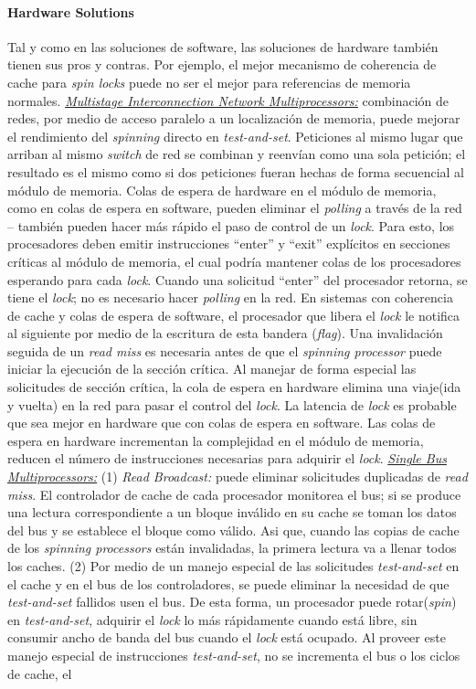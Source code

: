 \paragraph{\textnormal{\textbf{Hardware Solutions}}}
Tal y como en las soluciones de software, las soluciones de hardware también tienen sus pros y contras. Por ejemplo, el mejor mecanismo de coherencia de cache para \textit{spin locks} puede no ser el mejor para referencias de memoria normales. \underline{\textit{Multistage Interconnection Network Multiprocessors:}} combinación de redes, por medio de acceso paralelo a un localización de memoria, puede mejorar el rendimiento del \textit{spinning} directo en \textit{test-and-set}. Peticiones al mismo lugar que arriban al mismo \textit{switch} de red se combinan y reenvían como una sola petición; el resultado es el mismo como si dos peticiones fueran hechas de forma secuencial al módulo de memoria. Colas de espera de hardware en el módulo de memoria, como en colas de espera en software, pueden eliminar el \textit{polling} a través de la red -- también pueden hacer más rápido el paso de control de un \textit{lock}. Para esto, los procesadores deben emitir instrucciones ``enter'' y ``exit'' explícitos en secciones críticas al módulo de memoria, el cual podría mantener colas de los procesadores esperando para cada \textit{lock}. Cuando una solicitud ``enter'' del procesador retorna, se tiene el \textit{lock}; no es necesario hacer \textit{polling} en la red. En sistemas con coherencia de cache y colas de espera de software, el procesador que libera el \textit{lock} le notifica al siguiente por medio de la escritura de esta bandera (\textit{flag}). Una invalidación seguida de un \textit{read miss} es necesaria antes de que el \textit{spinning processor} puede iniciar la ejecución de la sección crítica. Al manejar de forma especial las solicitudes de sección crítica, la cola de espera en hardware elimina una viaje(ida y vuelta) en la red para pasar el control del \textit{lock}. La latencia de \textit{lock} es probable que sea mejor en hardware que con colas de espera en software. Las colas de espera en hardware incrementan la complejidad en el módulo de memoria, reducen el número de instrucciones necesarias para adquirir el \textit{lock}. \underline{\textit{Single Bus Multiprocessors:}} (1) \textit{Read Broadcast:} puede eliminar solicitudes duplicadas de \textit{read miss}. El controlador de cache de cada procesador monitorea el bus; si se produce una lectura correspondiente a un bloque inválido en su cache se toman los datos del bus y se establece el bloque como válido. Asi que, cuando las copias de cache de los \textit{spinning processors} están invalidadas, la primera lectura va a llenar todos los caches. (2) Por medio de un manejo especial de las solicitudes \textit{test-and-set} en el cache y en el bus de los controladores, se puede eliminar la necesidad de que \textit{test-and-set} fallidos usen el bus. De esta forma, un procesador puede rotar(\textit{spin}) en \textit{test-and-set}, adquirir el \textit{lock} lo más rápidamente cuando está libre, sin consumir ancho de banda del bus cuando el \textit{lock} está ocupado. Al proveer este manejo especial de instrucciones \textit{test-and-set}, no se incrementa el bus o los ciclos de cache, el 